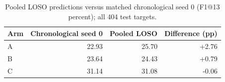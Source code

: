 \begin{table}[htbp]\centering\small
\caption{Pooled LOSO predictions versus matched chronological seed 0 (F1@13 percent); all 404 test targets.}\label{tab:losopooled}
\begin{tabular}{@{}lrrr@{}}\toprule
Arm & Chronological seed 0 & Pooled LOSO & Difference (pp)\\\midrule
A & 22.93 & 25.70 & +2.76\\
B & 23.64 & 24.43 & +0.79\\
C & 31.14 & 31.08 & -0.06\\
\bottomrule\end{tabular}\end{table}

